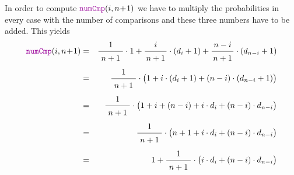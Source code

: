 In order to compute  $\mytt{numCmp}(i, n\!+\!1)$ we have to multiply the probabilities in every
case with the number of comparisons and these three numbers have to be added.  This yields
\begin{eqnarray*}
  \mytt{numCmp}(i, n\!+\!1) 
& = & \bruch{1}{\,n+1\,} \cdot 1 + \bruch{i}{n+1} \cdot (d_i + 1) + \bruch{n-i}{n+1} \cdot (d_{n-i} + 1) 
      \\[0.2cm]
& = & \bruch{1}{\,n+1\,} \cdot \bigl(1 + i \cdot (d_i + 1) + (n-i) \cdot (d_{n-i} + 1)\bigr)      \\[0.2cm]
& = & \bruch{1}{\,n+1\,} \cdot \bigl(1 + i + (n-i) + i \cdot d_i + (n-i) \cdot d_{n-i} \bigr)    \\[0.2cm]
& = & \bruch{1}{\,n+1\,} \cdot \bigl(n + 1 + i \cdot d_i + (n-i) \cdot d_{n-i} \bigr)            \\[0.2cm]
& = & 1 + \bruch{1}{\,n+1\,} \cdot \bigl(i \cdot d_i + (n-i) \cdot d_{n-i} \bigr) 
\end{eqnarray*}


